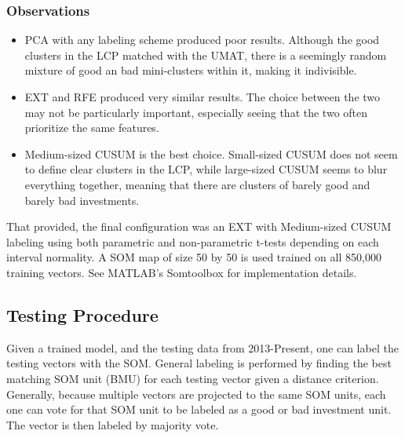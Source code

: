 \documentclass[preprint,12pt]{elsarticle}
\begin{document}
\subsubsection{Observations}
\begin{itemize}
	\item PCA with any labeling scheme produced poor results. Although the good clusters in the LCP matched with the UMAT, there is a seemingly random mixture of good an bad mini-clusters within it, making it indivisible. 
    \item EXT and RFE produced very similar results. The choice between the two may not be particularly important, especially seeing that the two often prioritize the same features. 
    \item Medium-sized CUSUM is the best choice. Small-sized CUSUM does not seem to define clear clusters in the LCP, while large-sized CUSUM seems to blur everything together, meaning that there are clusters of barely good and barely bad investments. 
\end{itemize}

That provided, the final configuration was an EXT with Medium-sized CUSUM labeling using both parametric and non-parametric t-tests depending on each interval normality. A SOM map of size 50 by 50 is used trained on all 850,000 training vectors. See MATLAB's Somtoolbox for implementation details. 

\subsection{Testing Procedure}
Given a trained model, and the testing data from 2013-Present, one can label the testing vectors with the SOM. General labeling is performed by finding the best matching SOM unit (BMU) for each testing vector given a distance criterion. Generally, because multiple vectors are projected to the same SOM units, each one can vote for that SOM unit to be labeled as a good or bad investment unit. The vector is then labeled by majority vote. 
\end{document}

